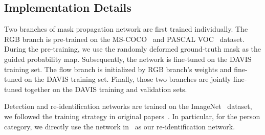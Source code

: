\subsection{Implementation Details}
\label{sec:implementation_details}
Two branches of mask propagation network are first trained individually.
%
The RGB branch is pre-trained on the MS-COCO~\cite{lin2014microsoft} and PASCAL VOC~\cite{everingham2010pascal} dataset.
%
During the pre-training, we use the randomly deformed ground-truth mask as the guided probability map.
%
Subsequently, the network is fine-tuned on the DAVIS training set.
%
The flow branch is initialized by RGB branch's weights and fine-tuned on the DAVIS training set.
%
Finally, those two branches are jointly fine-tuned together on the DAVIS training and validation sets.

Detection and re-identification networks are trained on the ImageNet~\cite{deng2009imagenet} dataset, we followed the training strategy in original papers~\cite{renNIPS15fasterrcnn, xiaoli2017joint}.
%
In particular, for the person category, we directly use the network in~\cite{xiaoli2017joint} as our re-identification network.

